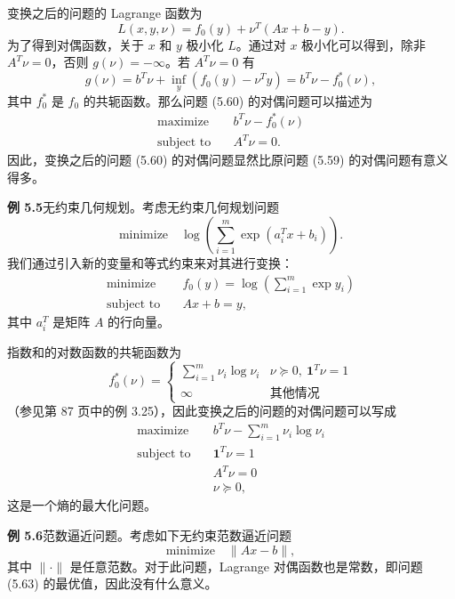 \documentclass[UTF8, 12pt, fontset=fandol, oneside]{ctexart}
\begin{document}
变换之后的问题的 Lagrange 函数为
\[
L(x,y,\nu)=f_0(y)+\nu^T(Ax+b-y).
\]
为了得到对偶函数，关于 $x$ 和 $y$ 极小化 $L$。通过对 $x$ 极小化可以得到，除非 $A^T\nu=0$，否则 $g(\nu)=-\infty$。若 $A^T\nu=0$ 有
\[
g(\nu)=b^T\nu+\inf_y(f_0(y)-\nu^Ty)=b^T\nu-f_0^\ast(\nu),
\]
其中 $f_0^\ast$ 是 $f_0$ 的共轭函数。那么问题 (5.60) 的对偶问题可以描述为
\begin{equation}
\begin{aligned}
\text{maximize}\quad & b^T\nu-f_0^\ast(\nu)\\
\text{subject to}\quad & A^T\nu=0.
\end{aligned}
\tag{5.61}
\end{equation}
因此，变换之后的问题 (5.60) 的对偶问题显然比原问题 (5.59) 的对偶问题有意义得多。

\noindent\textbf{例 5.5}\quad 无约束几何规划。考虑无约束几何规划问题
\[
\text{minimize}\quad \log\left(\sum_{i=1}^m\exp(a_i^Tx+b_i)\right).
\]
我们通过引入新的变量和等式约束来对其进行变换：
\[
\begin{aligned}
\text{minimize}\quad & f_0(y)=\log\left(\sum_{i=1}^m\exp y_i\right)\\
\text{subject to}\quad & Ax+b=y,
\end{aligned}
\]
其中 $a_i^T$ 是矩阵 $A$ 的行向量。

指数和的对数函数的共轭函数为
\[
f_0^\ast(\nu)=
\begin{cases}
\sum_{i=1}^m\nu_i\log\nu_i & \nu\succeq 0,\ \mathbf{1}^T\nu=1\\
\infty & \text{其他情况}
\end{cases}
\]
（参见第 87 页中的例 3.25），因此变换之后的问题的对偶问题可以写成
\begin{equation}
\begin{aligned}
\text{maximize}\quad & b^T\nu-\sum_{i=1}^m\nu_i\log\nu_i\\
\text{subject to}\quad & \mathbf{1}^T\nu=1\\
& A^T\nu=0\\
& \nu\succeq 0,
\end{aligned}
\tag{5.62}
\end{equation}
这是一个熵的最大化问题。

\noindent\textbf{例 5.6}\quad 范数逼近问题。考虑如下无约束范数逼近问题
\begin{equation}
\text{minimize}\quad \|Ax-b\|,
\tag{5.63}
\end{equation}
其中 $\|\cdot\|$ 是任意范数。对于此问题，Lagrange 对偶函数也是常数，即问题 (5.63) 的最优值，因此没有什么意义。
\end{document}
